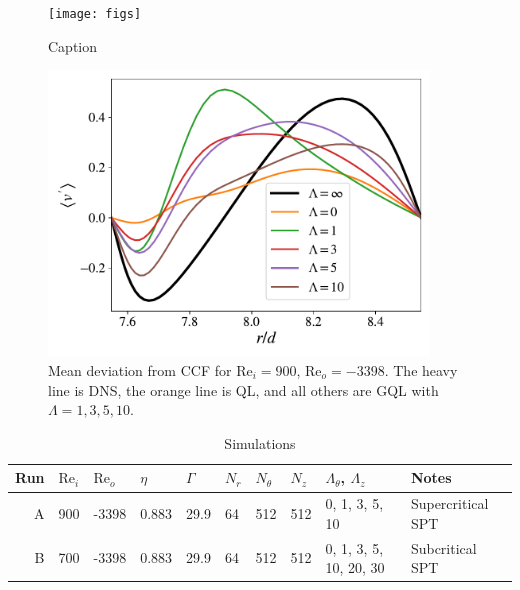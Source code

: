 \documentclass[openacc]{rstransa}%
\newcommand{\Reyn}{\mathrm{Re}}
\begin{document}
\begin{figure}
    \centering
    \texttt{[image: figs]}
    \caption{Caption}
    \label{fig:my_label}
\end{figure}

\begin{figure}
    \centering
    \includegraphics[width=0.9\textwidth]{figs/rei900_reo_-3398_vmean_profile.pdf}
    \caption{Mean deviation from CCF for $\Reyn_i = 900$, $\Reyn_o=-3398$. The heavy line is DNS, the orange line is QL, and all others are GQL with $\Lambda = 1,3,5,10$.}
    \label{fig:rei900_vmean}
\end{figure}

\begin{table}[!h]
\caption{Simulations}
\label{tab:simulations}
\begin{tabular}{rlllllllll}
\hline
Run & $\Reyn_i$ & $\Reyn_o$ & $\eta$ & $\Gamma$  & $N_r$ & $N_\theta$ & $N_z$& $\Lambda_\theta$, $\Lambda_z$ & Notes\\
\hline
A & 900 & -3398 & 0.883 & 29.9 & 64 & 512 & 512 & 0, 1, 3, 5, 10 & Supercritical SPT\\
B & 700 & -3398 & 0.883 & 29.9 & 64 & 512 & 512 & 0, 1, 3, 5, 10, 20, 30 & Subcritical SPT\\
\end{tabular}
\vspace*{-4pt}
\end{table}%
\end{document}
